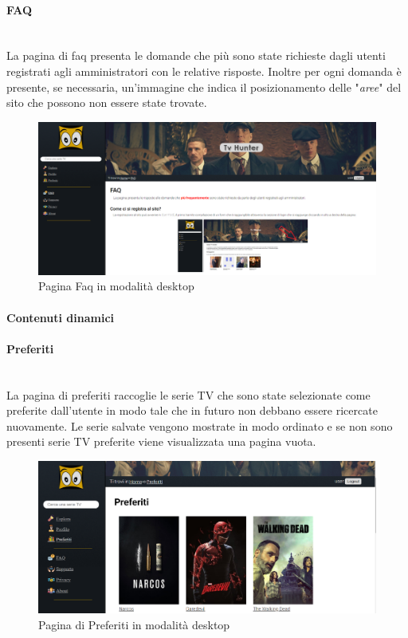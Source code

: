 \paragraph{FAQ} 
~\\
La pagina di faq presenta le domande che più sono state richieste dagli utenti registrati agli amministratori con le relative risposte. Inoltre per ogni domanda è presente, se necessaria, un'immagine che indica il posizionamento delle "\textit{aree}" del sito che possono non essere state trovate.
\begin{figure}[H]
	\centerline{\includegraphics[scale= 0.33]{img/faq.png}}
	\caption{Pagina Faq in modalità desktop}
	
\end{figure}
	

\paragraph{Contenuti dinamici}   

\paragraph{Preferiti}
~\\	
La pagina di preferiti raccoglie le serie TV che sono state selezionate come preferite dall'utente in modo tale che in futuro non debbano essere ricercate nuovamente. Le serie salvate vengono mostrate in modo ordinato e se non sono presenti serie TV preferite viene visualizzata una pagina vuota. 
\begin{figure}[H]
	\centerline{\includegraphics[scale=0.33]{img/preferiti.png}}
	\caption{Pagina di Preferiti in modalità desktop}
	\label{fig:addForm}
\end{figure}	


